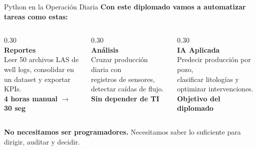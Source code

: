 \documentclass[aspectratio=169, 11pt]{beamer}
\begin{document}
\begin{frame}{Python en la Operación Diaria}
  \vspace{-2pt}
  {\small\color{arcaDark}\bfseries
    Con este diplomado vamos a automatizar tareas como estas:}

  \vspace{10pt}
  \begin{columns}[T]
    \begin{column}{0.30\textwidth}
      \centering
      {\Huge\color{arcaRed}\faFileExcel}\\[8pt]
      {\small\bfseries\color{arcaDark} Reportes}\\[4pt]
      {\scriptsize\color{textMuted}
        Leer 50 archivos LAS de\\
        well logs, consolidar en\\
        un dataset y exportar KPIs.\\[4pt]
        \textbf{4 horas manual} $\rightarrow$ \textbf{30 seg}}
    \end{column}

    \begin{column}{0.30\textwidth}
      \centering
      {\Huge\color{arcaRed}\faChartBar}\\[8pt]
      {\small\bfseries\color{arcaDark} Análisis}\\[4pt]
      {\scriptsize\color{textMuted}
        Cruzar producción diaria con\\
        registros de sensores,\\
        detectar caídas de flujo.\\[4pt]
        \textbf{Sin depender de TI}}
    \end{column}

    \begin{column}{0.30\textwidth}
      \centering
      {\Huge\color{arcaRed}\faRobot}\\[8pt]
      {\small\bfseries\color{arcaDark} IA Aplicada}\\[4pt]
      {\scriptsize\color{textMuted}
        Predecir producción por pozo,\\
        clasificar litologías y\\
        optimizar intervenciones.\\[4pt]
        \textbf{Objetivo del diplomado}}
    \end{column}
  \end{columns}

  \vspace{14pt}
  \centering
  {\footnotesize\color{arcaDark}
    \textbf{No necesitamos ser programadores.}
    Necesitamos saber lo suficiente para dirigir, auditar y decidir.}
\end{frame}
\end{document}
